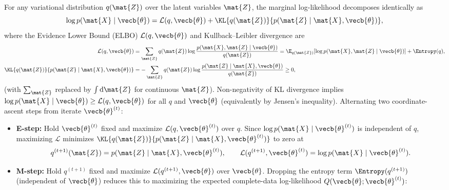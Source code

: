 \documentclass[../../../../master.tex]{subfiles}
\begin{document}
\begin{coremath}
\label{thm:em:elbo_ascent}
For any variational distribution $q(\mat{Z})$ over the latent variables $\mat{Z}$, the marginal log-likelihood decomposes identically as
\begin{equation}
  \log p(\mat{X} \mid \vecb{\theta}) = \mathcal{L}(q, \vecb{\theta}) + \KL{q(\mat{Z})}{p(\mat{Z} \mid \mat{X}, \vecb{\theta})},
  \label{eq:em:elbo_decomp}
\end{equation}
where the Evidence Lower Bound (ELBO) $\mathcal{L}(q, \vecb{\theta})$ and Kullback--Leibler divergence are
\begin{align}
  \mathcal{L}(q, \vecb{\theta}) &= \sum_{\mat{Z}} q(\mat{Z}) \log \frac{p(\mat{X}, \mat{Z} \mid \vecb{\theta})}{q(\mat{Z})} = \E_{q(\mat{Z})}[\log p(\mat{X}, \mat{Z} \mid \vecb{\theta})] + \Entropy(q), \label{eq:em:elbo_def} \\
  \KL{q(\mat{Z})}{p(\mat{Z} \mid \mat{X}, \vecb{\theta})} &= -\sum_{\mat{Z}} q(\mat{Z}) \log \frac{p(\mat{Z} \mid \mat{X}, \vecb{\theta})}{q(\mat{Z})} \ge 0, \label{eq:em:kl_def}
\end{align}
(with $\sum_{\mat{Z}}$ replaced by $\int \mathrm{d}\mat{Z}$ for continuous $\mat{Z}$). Non-negativity of KL divergence implies $\log p(\mat{X} \mid \vecb{\theta}) \ge \mathcal{L}(q, \vecb{\theta})$ for all $q$ and $\vecb{\theta}$ (equivalently by Jensen's inequality). Alternating two coordinate-ascent steps from iterate $\vecb{\theta}^{(t)}$:
\begin{itemize}
  \item \textbf{E-step:} Hold $\vecb{\theta}^{(t)}$ fixed and maximize $\mathcal{L}(q, \vecb{\theta}^{(t)})$ over $q$. Since $\log p(\mat{X} \mid \vecb{\theta}^{(t)})$ is independent of $q$, maximizing $\mathcal{L}$ minimizes $\KL{q(\mat{Z})}{p(\mat{Z} \mid \mat{X}, \vecb{\theta}^{(t)})}$ to zero at
  \begin{equation}
    q^{(t+1)}(\mat{Z}) = p(\mat{Z} \mid \mat{X}, \vecb{\theta}^{(t)}), \qquad \mathcal{L}(q^{(t+1)}, \vecb{\theta}^{(t)}) = \log p(\mat{X} \mid \vecb{\theta}^{(t)}).
    \label{eq:em:estep_general}
  \end{equation}
  \item \textbf{M-step:} Hold $q^{(t+1)}$ fixed and maximize $\mathcal{L}(q^{(t+1)}, \vecb{\theta})$ over $\vecb{\theta}$. Dropping the entropy term $\Entropy(q^{(t+1)})$ (independent of $\vecb{\theta}$) reduces this to maximizing the expected complete-data log-likelihood $Q(\vecb{\theta}; \vecb{\theta}^{(t)})$:

\end{itemize}
\end{coremath}
\end{document}
